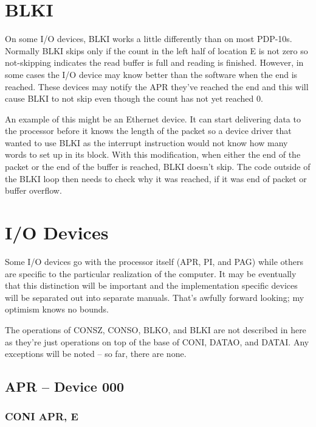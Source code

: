 \documentclass[12pt]{report}
\newcommand{\code}[1]{\textsf{#1}}
\begin{document}
\section{BLKI}

On some I/O devices, \code{BLKI} works a little differently than on most PDP-10s.  Normally
\code{BLKI} skips only if the count in the left half of location \code{E} is not zero so
not-skipping indicates the read buffer is full and reading is finished.  However, in some
cases the I/O device may know better than the software when the end is reached.  These
devices may notify the APR they've reached the end and this will cause \code{BLKI} to not
skip even though the count has not yet reached 0.

An example of this might be an Ethernet device.  It can start delivering data to the
processor before it knows the length of the packet so a device driver that wanted to use
\code{BLKI} as the interrupt instruction would not know how many words to set up in its
block.  With this modification, when either the end of the packet or the end of the buffer
is reached, \code{BLKI} doesn't skip.  The code outside of the \code{BLKI} loop then needs
to check why it was reached, if it was end of packet or buffer overflow.

\section{I/O Devices}

Some I/O devices go with the processor itself (APR, PI, and PAG) while others are specific
to the particular realization of the computer.  It may be eventually that this distinction
will be important and the implementation specific devices will be separated out into
separate manuals.  That's awfully forward looking; my optimism knows no bounds.

The operations of \code{CONSZ}, \code{CONSO}, \code{BLKO}, and \code{BLKI} are not
described in here as they're just operations on top of the base of \code{CONI},
\code{DATAO}, and \code{DATAI}.  Any exceptions will be noted -- so far, there are none.


\subsection{APR -- Device 000}

\subsubsection{CONI APR, E}
\end{document}
